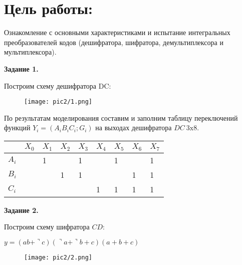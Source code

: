 \documentclass[spec, och, labwork]{shiza}
\begin{document}


\section{Цель работы:}

Ознакомление с основными характеристиками и испытание 
интегральных преобразователей кодов (дешифратора, шифратора, демультиплексора 
и мультиплексора).

\textbf{Задание 1.}

Построим схему дешифратора DC:

\begin{figure}[H]
    \centering
    \texttt{[image: pic2/1.png]}
    \caption{}
\end{figure}

По результатам моделирования составим и заполним таблицу переключений 
функций $Y_i=(A_iB_iC_i;G_i)$ на выходах дешифратора $DC ~3\text{x}8$.

\begin{table}[h]
    \begin{center}
    \begin{tabular}{|l|l|l|l|l|l|l|l|l|}
    \hline
          & $X_0$ & $X_1$ & $X_2$ & $X_3$ & $X_4$ & $X_5$ & $X_6$ & $X_7$ \\ \hline
    $A_i$ &       & 1     &       & 1     &       & 1     &       & 1     \\ \hline
    $B_i$ &       &       & 1     & 1     &       &       & 1     & 1     \\ \hline
    $C_i$ &       &       &       &       & 1     & 1     & 1     & 1     \\ \hline
    \end{tabular}
\end{center}
\end{table}


\textbf{Задание 2.}

Построим схему шифратора $CD$:


\begin{center}$y=(ab+\urcorner c)(\urcorner a+\urcorner b+c)(a+b+c)$\end{center}

\begin{figure}[H]
    \centering
    \texttt{[image: pic2/2.png]}
    \caption{}
\end{figure}
\end{document}
